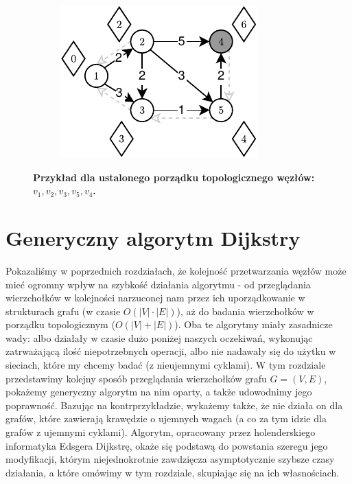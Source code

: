 \begin{figure}[!htbp]
\begin{subfigure}[b]{0.18\textwidth}
		\includegraphics[width=\textwidth]{Chapter_II/TOPOLOGIC-SHORTEST-PATH-Example/e.pdf}
		\caption{}
	\end{subfigure}
	\caption{\textbf{Przykład dla ustalonego porządku topologicznego węzłów: $v_{1}, v_{2}, v_{3}, v_{5}, v_{4}$.}} \label{fig:exampleTopologicalShotrestPath}
\end{figure}

\newpage
\section{Generyczny algorytm Dijkstry}

Pokazaliśmy w poprzednich rozdziałach, że kolejność przetwarzania węzłów może mieć ogromny wpływ na szybkość działania algorytmu - od przeglądania wierzchołków w kolejności narzuconej nam przez ich uporządkowanie w strukturach grafu (w czasie $ O \left( \left| V \right| \cdot \left| E \right| \right)$), aż do badania wierzchołków w porządku topologicznym ($ O \left( \left| V \right| + \left| E \right| \right)$). Oba te algorytmy miały zasadnicze wady: albo działały w czasie dużo poniżej naszych oczekiwań, wykonując zatrważającą ilość niepotrzebnych operacji, albo nie nadawały się do użytku w sieciach, które my chcemy badać (z nieujemnymi cyklami). W tym rozdziale przedstawimy kolejny sposób przeglądania wierzchołków grafu $G = \left( V, E \right)$, pokażemy generyczny algorytm na nim oparty, a także udowodnimy jego poprawność. Bazując na kontrprzykładzie, wykażemy także, że nie działa on dla grafów, które zawierają krawędzie o ujemnych wagach (a co za tym idzie dla grafów z ujemnymi cyklami). Algorytm, opracowany przez holenderskiego informatyka Edsgera Dijkstrę, okaże się podstawą do powstania szeregu jego modyfikacji, którym niejednokrotnie zawdzięcza asymptotycznie szybsze czasy działania, a które omówimy w tym rozdziale, skupiając się na ich własnościach.

